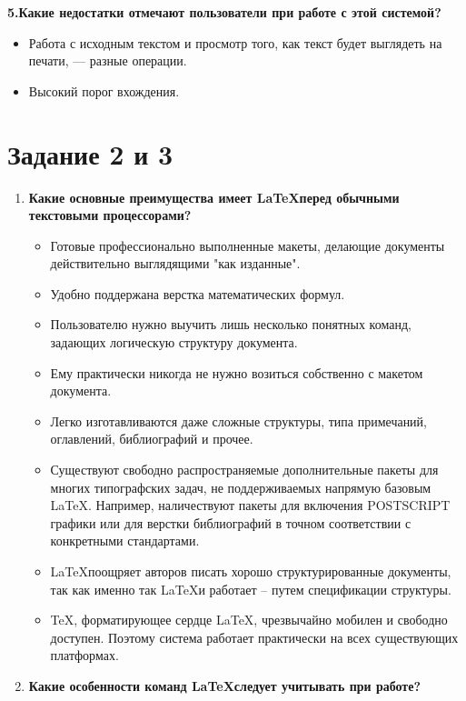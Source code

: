 \documentclass[a4paper,12pt]{article} %
\begin{document}
\textbf{5.Какие недостатки отмечают пользователи при работе с этой системой?}
\begin{itemize}
\item Работа с исходным текстом и просмотр того, как текст будет выглядеть на печати, — разные операции. 
\item Высокий порог вхождения.
\end{itemize}

\section{Задание 2 и 3}
\begin{enumerate}
\item \textbf{Какие основные преимущества имеет \LaTeX перед обычными текстовыми процессорами?}\\


\begin{itemize}
\item Готовые профессионально выполненные макеты, делающие документы действительно выглядящими "как изданные". 
\item Удобно поддержана верстка математических формул.
\item Пользователю нужно выучить лишь несколько понятных команд, задающих логическую структуру документа. \item Ему практически никогда не нужно возиться собственно с макетом документа.
\item Легко изготавливаются даже сложные структуры, типа примечаний, оглавлений, библиографий и прочее.
\item Существуют свободно распространяемые дополнительные пакеты для многих типографских задач, не поддерживаемых напрямую базовым \LaTeX. Например, наличествуют пакеты для включения POSTSCRIPT графики или для верстки библиографий в точном соответствии с конкретными стандартами.
\item \LaTeX поощряет авторов писать хорошо структурированные документы, так как именно так \LaTeX и работает -- путем спецификации структуры.
\item \TeX, форматирующее сердце \LaTeX, чрезвычайно мобилен и свободно доступен. Поэтому система работает практически на всех существующих платформах.
\end{itemize}

\item \textbf{Какие особенности команд \LaTeX следует учитывать при работе?}\\


\end{enumerate}
\end{document}
